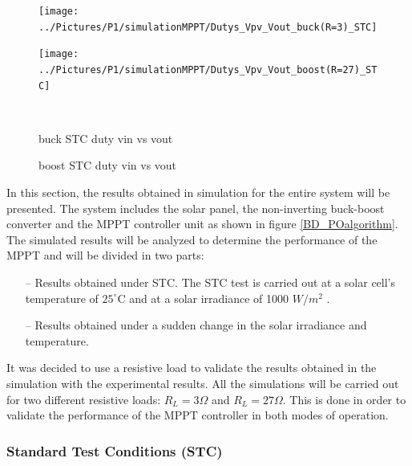 \begin{figure}[H]
	\begin{minipage}[c]{0.6\textwidth}
		\centering
		\texttt{[image: ../Pictures/P1/simulationMPPT/Dutys\_Vpv\_Vout\_buck(R=3)\_STC]} %
	\end{minipage}%
	\hfill
	\begin{minipage}[c]{0.6\textwidth}
		\centering
		\texttt{[image: ../Pictures/P1/simulationMPPT/Dutys\_Vpv\_Vout\_boost(R=27)\_STC]} %
	\end{minipage} \\ %
	\begin{minipage}[t]{0.6\textwidth}
		\caption{buck STC duty vin vs vout} %
		\label{buckSTC_duty}
	\end{minipage}%
	\hfill
	\begin{minipage}[t]{0.6\textwidth}
		\caption{boost STC duty vin vs vout} %
		\label{boostSTC_duty}
	\end{minipage}
\end{figure}
\fi 

In this section, the results obtained in simulation for the entire system will be presented. The system includes the solar panel, the non-inverting buck-boost converter and the MPPT controller unit as shown in figure \ref{BD_POalgorithm}. The simulated results will be analyzed to determine the performance of the MPPT and will be divided in two parts: 
\begin{itemize}
	\item[--] Results obtained under STC. The STC test is carried out at a solar cell's temperature of $25^\circ$C and at a solar irradiance of 1000 $W/ m^2$ \cite{handbook}.
	\item[--] Results obtained under a sudden change in the solar irradiance and temperature.
\end{itemize}

 It was decided to use a resistive load to validate the results obtained in the simulation with the experimental results. All the simulations will be carried out for two different resistive loads: $R_{L}=3\Omega$ and $R_{L}=27\Omega$. This is done in order to validate the performance of the MPPT controller in both modes of operation.
 
 \subsubsection*{Standard Test Conditions (STC)}
 
